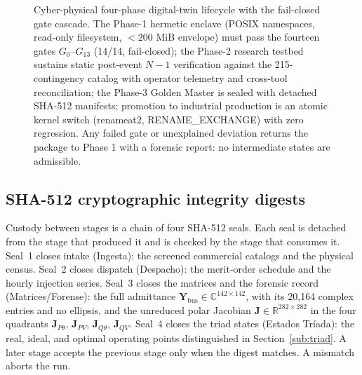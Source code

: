 \begin{figure}[!t]
\centering
\resizebox{0.88\textwidth}{!}{} %
\caption{Cyber-physical four-phase digital-twin lifecycle with the fail-closed gate cascade. The Phase-1 hermetic enclave (POSIX namespaces, read-only filesystem, ${<}200$ MiB envelope) must pass the fourteen gates $G_0$--$G_{13}$ (14/14, fail-closed); the Phase-2 research testbed sustains static post-event $N-1$ verification against the 215-contingency catalog with operator telemetry and cross-tool reconciliation; the Phase-3 Golden Master is sealed with detached SHA-512 manifests; promotion to industrial production is an atomic kernel switch (renameat2, RENAME\_EXCHANGE) with zero regression. Any failed gate or unexplained deviation returns the package to Phase 1 with a forensic report: no intermediate states are admissible.}
\label{fig:gemelo_fases}
\end{figure}


\subsection{SHA-512 cryptographic integrity digests}
\label{sub:seals}

Custody between stages is a chain of four SHA-512 seals. Each seal is detached from the stage that produced it and is checked by the stage that consumes it. Seal~1 closes intake (Ingesta): the screened commercial catalogs and the physical census. Seal~2 closes dispatch (Despacho): the merit-order schedule and the hourly injection series. Seal~3 closes the matrices and the forensic record (Matrices/Forense): the full admittance $\mathbf{Y}_{\mathrm{bus}}\in\mathbb{C}^{142\times 142}$, with its 20,164 complex entries and no ellipsis, and the unreduced polar Jacobian $\mathbf{J}\in\mathbb{R}^{282\times 282}$ in the four quadrants $\mathbf{J}_{P\theta}$, $\mathbf{J}_{PV}$, $\mathbf{J}_{Q\theta}$, $\mathbf{J}_{QV}$. Seal~4 closes the triad states (Estados Tríada): the real, ideal, and optimal operating points distinguished in Section~\ref{sub:triad}. A later stage accepts the previous stage only when the digest matches. A mismatch aborts the run.

